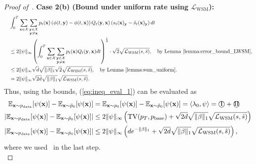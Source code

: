 \documentclass{article} %
\def\eqref#1{equation~\ref{#1}}
\newcommand{\bfx}{{\bf x}}
\newcommand{\bfy}{ {\bf y}}
\newcommand{\TV}{\mathrm{TV}}
\newcommand{\cI}{\text{\textcircled{I}}}
\newcommand{\cII}{\text{\textcircled{II}}}
\newcommand{\LWSM}{\mathcal{L}_{\mathrm{WSM}}}
\renewcommand{\eqref}[1]{\textup{(\ref{#1})}}
\begin{document}
\begin{proof}[Proof of~]
\textbf{Case 2(b) (Bound under uniform rate using $\LWSM$):} \begin{align*}
    &\int_0^T \sum_{\substack{\bfx\in\mathcal{X}}} \sum_{\substack{\bfy\in\mathcal{X} \\ \bfy\neq \bfx}}  p_t(\bfx) \left(\phi(t, \bfy)-\phi(t, \bfx) \right) Q_t(\bfy, \bfx) \left( s_t(\bfx)_\bfy - \tilde{s}_t(\bfx)_\bfy \right)  dt \\
    \quad & \leq 2 \| \psi \|_\infty \left(\int_0^T \sum_{\substack{\bfx\in\mathcal{X}}} \sum_{\substack{\bfy\in\mathcal{X} \\\bfy\neq \bfx}} p_t(\bfx)  Q_t(\bfy, \bfx)  dt\right)^{\frac{1}{2}} \cdot \sqrt{2} \sqrt{\LWSM(s, \tilde{s})}, \quad \text{by Lemma~\ref{lemma:error_bound_LWSM}}, \\
    \quad &\leq 2 \| \psi \|_\infty \sqrt{d} \sqrt{\|\beta \|_1}  \sqrt{2} \sqrt{\LWSM(s, \tilde{s})}, \quad \text{by Lemma~\ref{lemma:sum_uniform}.} \\
    \quad & = 2 \| \psi \|_\infty \sqrt{2d} \sqrt{\|\beta \|_1}  \sqrt{\LWSM(s, \tilde{s})}.
\end{align*}
Thus, 
using the bounds, \eqref{eq:ineq_eval_1} can be evaluated as
\begin{align}
    \mathbb{E}_{\bfx \sim p_{\mathrm{data}}}[\psi(\bfx)] - \mathbb{E}_{\bfx \sim \tilde{p}_0}[\psi(\bfx)]  &=  \mathbb{E}_{\bfx \sim p_{0}}[\psi(\bfx)] - \mathbb{E}_{\bfx \sim \tilde{p}_0}[\psi(\bfx)] = \langle \lambda_0, \psi \rangle = \cI + \cII \nonumber \\
    \left| \mathbb{E}_{\bfx \sim p_{\mathrm{data}}}[\psi(\bfx)] - \mathbb{E}_{\bfx \sim \tilde{p}_0}[\psi(\bfx)] \right| &\leq 2 \|\psi\|_\infty \left( \TV(p_T, p_{\rm base}) +  \sqrt{2d} \sqrt{\|\beta \|_1}  \sqrt{\LWSM(s, \tilde{s})} \right) \nonumber \\
    \left| \mathbb{E}_{\bfx \sim p_{\mathrm{data}}}[\psi(\bfx)] - \mathbb{E}_{\bfx \sim \tilde{p}_0}[\psi(\bfx)] \right| &\leq 2 \|\psi\|_\infty \left( d e^{-\| \beta \|_1} +  \sqrt{2d} \sqrt{\|\beta \|_1}  \sqrt{\LWSM(s, \tilde{s})} \right), \nonumber 
\end{align}
where we used~ in the last step. \\


\end{proof}
\end{document}
